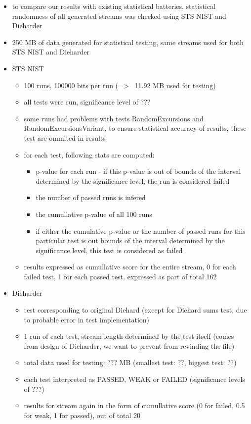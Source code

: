 \documentclass[12pt,oneside]{fithesis2}
\begin{document}
\begin{itemize}
\item to compare our results with existing statistical batteries, statistical randomness of all generated streams was checked using STS NIST and Dieharder
\item 250 MB of data generated for statistical testing, same streams used for both STS NIST and Dieharder
\item STS NIST
\begin{itemize}
\item 100 runs, 100000 bits per run (=> ~11.92 MB used for testing)
\item all tests were run, significance level of ???
\item some runs had problems with tests RandomExcursions and RandomExcursionsVariant, to ensure statistical accuracy of results, these test are ommited in results
\item for each test, following stats are computed:
\begin{itemize}
\item p-value for each run - if this p-value is out of bounds of the interval determined by the significance level, the run is considered failed
\item the number of passed runs is infered
\item the cumullative p-value of all 100 runs
\item if either the cumulative p-value or the number of passed runs for this particular test is out bounds of the interval determined by the significance level, this test is considered as failed
\end{itemize}
\item results expressed as cumullative score for the entire stream, 0 for each failed test, 1 for each passed test. expressed as part of total 162
\end{itemize}
\item Dieharder
\begin{itemize}
\item test corresponding to original Diehard (except for Diehard sums test, due to probable error in test implementation)
\item 1 run of each test, stream length determined by the test itself (comes from design of Dieharder, we want to prevent from revinding the file)
\item total data used for testing: ??? MB (smallest test: ??, biggest test: ??)
\item each test interpreted as PASSED, WEAK or FAILED (significance levels of ???)
\item results for stream again in the form of cumullative score (0 for failed, 0.5 for weak, 1 for passed), out of total 20
\end{itemize}
\end{itemize}
\end{document}
